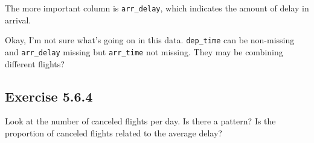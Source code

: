\documentclass[]{book}
\newenvironment{Shaded}{\begin{snugshade}}{\end{snugshade}}
\newcommand{\CommentTok}[1]{\textcolor[rgb]{0.56,0.35,0.01}{\textit{#1}}}
\newcommand{\KeywordTok}[1]{\textcolor[rgb]{0.13,0.29,0.53}{\textbf{#1}}}
\newcommand{\NormalTok}[1]{#1}
\newcommand{\OperatorTok}[1]{\textcolor[rgb]{0.81,0.36,0.00}{\textbf{#1}}}
\newcommand{\StringTok}[1]{\textcolor[rgb]{0.31,0.60,0.02}{#1}}
\theoremstyle{plain}
\theoremstyle{remark}
\theoremstyle{definition}
\theoremstyle{definition}
\theoremstyle{definition}
\theoremstyle{remark}
\begin{document}
The more important column is \texttt{arr\_delay}, which indicates the
amount of delay in arrival.

\begin{Shaded}
\end{Shaded}

Okay, I'm not sure what's going on in this data. \texttt{dep\_time} can
be non-missing and \texttt{arr\_delay} missing but \texttt{arr\_time}
not missing. They may be combining different flights?

\hypertarget{exercise-5.6.4}{%
\subsection*{\texorpdfstring{Exercise
{5.6.4}}{Exercise 5.6.4}}\label{exercise-5.6.4}}

Look at the number of canceled flights per day. Is there a pattern? Is
the proportion of canceled flights related to the average delay?
\end{document}
